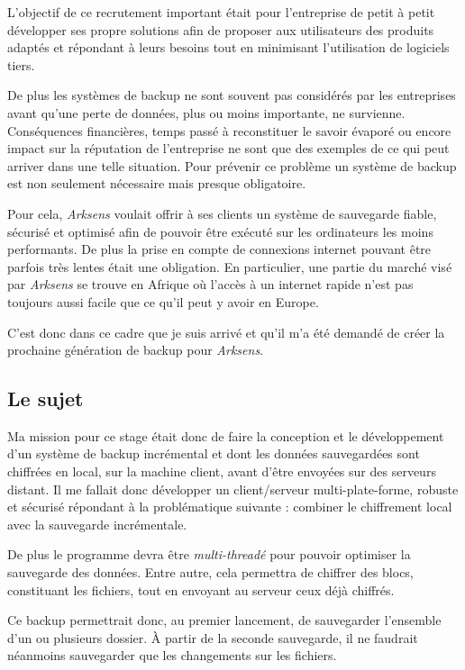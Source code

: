 \documentclass[a4paper,10pt, twoside]{report}
\begin{document}
\begin{spacing}{1.2}
L'objectif de ce recrutement important \'etait pour l'entreprise de petit \`a
petit d\'evelopper ses propre solutions afin de proposer aux utilisateurs des
produits adapt\'es et r\'epondant \`a leurs besoins tout en minimisant
l'utilisation de logiciels tiers.

De plus les syst\`emes de backup ne sont souvent pas consid\'er\'es par les
entreprises avant qu'une perte de donn\'ees, plus ou moins importante,
ne survienne. Cons\'equences financi\`eres, temps pass\'e \`a reconstituer le
savoir \'evapor\'e ou encore impact sur la r\'eputation de l'entreprise ne sont
que des exemples de ce qui peut arriver dans une telle situation. Pour
pr\'evenir ce probl\`eme un syst\`eme de backup est non seulement n\'ecessaire
mais presque obligatoire.

Pour cela, \textit{Arksens} voulait offrir \`a ses clients un syst\`eme de
sauvegarde fiable, s\'ecuris\'e et optimis\'e afin de pouvoir \^etre
ex\'ecut\'e sur les ordinateurs les moins performants. De plus la prise en
compte de connexions internet pouvant \^etre parfois tr\`es lentes \'etait une
obligation. En particulier, une partie du march\'e vis\'e par \textit{Arksens}
se trouve en Afrique o\`u l'acc\`es \`a un internet rapide n'est pas toujours
aussi facile que ce qu'il peut y avoir en Europe.

C'est donc dans ce cadre que je suis arriv\'e et qu'il m'a \'et\'e demand\'e
de cr\'eer la prochaine g\'en\'eration de backup pour \textit{Arksens}.

\subsection{Le sujet}
Ma mission pour ce stage \'etait donc de faire la conception et le
d\'eveloppement d'un syst\`eme de backup incr\'emental et dont les donn\'ees
sauvegard\'ees sont chiffr\'ees en local, sur la machine client, avant d'\^etre
envoy\'ees sur des serveurs distant. Il me fallait donc d\'evelopper un
client/serveur multi-plate-forme, robuste et s\'ecuris\'e r\'epondant \`a
la probl\'ematique suivante : combiner le chiffrement local avec la sauvegarde
incr\'ementale.

De plus le programme devra \^etre \textit{multi-thread\'e} pour pouvoir
optimiser la sauvegarde des donn\'ees. Entre autre, cela permettra de chiffrer
des blocs, constituant les fichiers, tout en envoyant au serveur ceux d\'ej\`a
chiffr\'es.

Ce backup permettrait donc, au premier lancement, de sauvegarder l'ensemble
d'un ou plusieurs dossier. \`A partir de la seconde sauvegarde, il ne faudrait
n\'eanmoins sauvegarder que les changements sur les fichiers.


\end{spacing}
\end{document}
